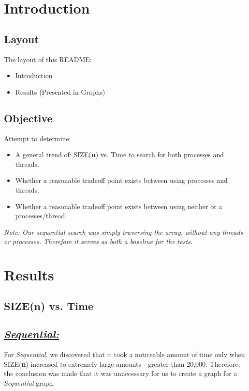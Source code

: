\documentclass{article}
\title{\vspace{-0.5cm}\titletext}
\date{\vspace{-5ex}}
\begin{document}
    \maketitle
    \thispagestyle{fancy}
    \vspace{-1.0cm}

    \section{Introduction}
        \subsection{Layout}
            The layout of this README:
            \begin{itemize}
                \item Introduction
                \item Results (Presented in Graphs)
            \end{itemize}
        \subsection{Objective}
            Attempt to determine:
            \begin{itemize}
                \item A general trend of: SIZE(\textbf{n}) vs. Time to search for both processes and threads.
                \item Whether a reasonable tradeoff point exists between using processes and threads.
                \item Whether a reasonable tradeoff point exists between using neither or a processes/thread.
            \end{itemize}
        \textit{Note: Our sequential search was simply traversing the array, without any threads or processes. Therefore it serves as both a baseline for the tests.}
    \pagebreak
    \section{Results}
        \subsection{SIZE(\textbf{n}) vs. Time}
            \subsection*{\textit{\underline{Sequential:}}}
                For \textit{Sequential}, we discovered that it took a noticeable amount of time only when SIZE(\textbf{n}) increased to extremely large amounts - greater than 20,000. 
                Therefore, the conclusion was made that it was unnecessary for us to create a graph for a \textit{Sequential} graph.
\end{document}
